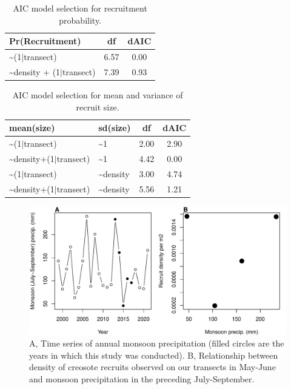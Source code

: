 \documentclass[11pt]{article}\usepackage[]{graphicx}\usepackage[usenames,dvipsnames]{xcolor}
\begin{document}
\begin{table}[ht]
\centering
\begin{tabular}{|p{8cm}|c|c|}
  \hline
Pr(Recruitment) & df & dAIC \\ 
  \hline
\~{}(1$|$transect) & 6.57 & 0.00 \\ 
  \~{}density + (1$|$transect) & 7.39 & 0.93 \\ 
   \hline
\end{tabular}
\caption{AIC model selection for recruitment probability.} 
\label{tab:recruit_aic}
\end{table}


\begin{table}[ht]
\centering
\begin{tabular}{|p{8cm}|p{4cm}|c|c|}
  \hline
mean(size) & sd(size) & df & dAIC \\ 
  \hline
\~{}(1$|$transect) & \~{}1 & 2.00 & 2.90 \\ 
  \~{}density+(1$|$transect) & \~{}1 & 4.42 & 0.00 \\ 
  \~{}(1$|$transect) & \~{}density & 3.00 & 4.74 \\ 
  \~{}density+(1$|$transect) & \~{}density & 5.56 & 1.21 \\ 
   \hline
\end{tabular}
\caption{AIC model selection for mean and variance of recruit size.} 
\label{tab:recruitsize_aic}
\end{table}


\newpage
\begin{figure}[H]
  \begin{center}
    \includegraphics[width=\linewidth]{Figures/monsoon_seedlings}
  \caption{A, Time series of annual monsoon precipitation (filled circles are the years in which this study was conducted). B, Relationship between density of creosote recruits observed on our transects in May-June and monsoon precipitation in the preceding July-September.}
  \label{fig:monsoon}
  \end{center}
\end{figure}
\end{document}
